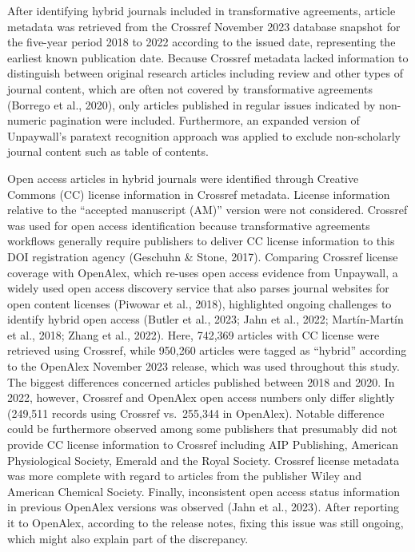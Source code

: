 \documentclass[a4paper,man,floatsintext,longtable,noextraspace,12pt]{apa6}
\begin{document}
After identifying hybrid journals included in transformative agreements,
article metadata was retrieved from the Crossref November 2023 database
snapshot for the five-year period 2018 to 2022 according to the issued
date, representing the earliest known publication date. Because Crossref
metadata lacked information to distinguish between original research
articles including review and other types of journal content, which are
often not covered by transformative agreements (Borrego et al., 2020),
only articles published in regular issues indicated by non-numeric
pagination were included. Furthermore, an expanded version of
Unpaywall's paratext recognition approach was applied to exclude
non-scholarly journal content such as table of contents.

Open access articles in hybrid journals were identified through Creative
Commons (CC) license information in Crossref metadata. License
information relative to the ``accepted manuscript (AM)'' version were
not considered. Crossref was used for open access identification because
transformative agreements workflows generally require publishers to
deliver CC license information to this DOI registration agency (Geschuhn
\& Stone, 2017). Comparing Crossref license coverage with OpenAlex,
which re-uses open access evidence from Unpaywall, a widely used open
access discovery service that also parses journal websites for open
content licenses (Piwowar et al., 2018), highlighted ongoing challenges
to identify hybrid open access (Butler et al., 2023; Jahn et al., 2022;
Martín-Martín et al., 2018; Zhang et al., 2022). Here, 742,369 articles
with CC license were retrieved using Crossref, while 950,260 articles
were tagged as ``hybrid'' according to the OpenAlex November 2023
release, which was used throughout this study. The biggest differences
concerned articles published between 2018 and 2020. In 2022, however,
Crossref and OpenAlex open access numbers only differ slightly (249,511
records using Crossref vs.~255,344 in OpenAlex). Notable difference
could be furthermore observed among some publishers that presumably did
not provide CC license information to Crossref including AIP Publishing,
American Physiological Society, Emerald and the Royal Society. Crossref
license metadata was more complete with regard to articles from the
publisher Wiley and American Chemical Society. Finally, inconsistent
open access status information in previous OpenAlex versions was
observed (Jahn et al., 2023). After reporting it to OpenAlex, according
to the release notes, fixing this issue was still ongoing, which might
also explain part of the discrepancy.
\end{document}
